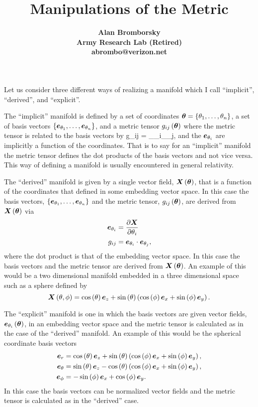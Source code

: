 \documentclass[12pt]{book}
\title{\bf\Large Manipulations of the Metric}
\author{\bf Alan Bromborsky\\
\bf Army Research Lab (Retired)\\
\bf abrombo@verizon.net}
\begin{document}
\parskip 10pt
\maketitle
Let us consider three different ways of realizing a manifold which I call ``implicit'', ``derived'', and 
``explicit''.

The ``implicit'' manifold is defined by a set of coordinates $\bm{\theta} = \left \{ {\theta_{1},\dots,\theta_{n}} \right \}$, 
a set of basis vectors $\left \{ {\bm{e}_{\theta_{1}},\dots,\bm{e}_{\theta_{n}}} \right \}$, 
and a metric tensor ${g_{ij}}\left ( {\bm{\theta}} \right )$ where the
metric tensor is related to the basis vectors by 
\be
	g_{ij} = \eb_{\theta_{i}}\cdot\eb_{\theta_{j}},
\ee
and the $\bm{e}_{\theta_{i}}$ are implicitly a function of the coordinates.  That is to say for an ``implicit'' manifold
the metric tensor defines the dot products of the basis vectors and not vice versa. This way of defining a 
manifold is usually encountered in general relativity.

The ``derived'' manifold is given by a single vector field, ${\bm{X}}\left ( {\bm{\theta}} \right )$, that is a function of 
the coordinates that defined in some embedding vector space. In this case the basis vectors, 
$\left \{ {\bm{e}_{\theta_{1}},\dots,\bm{e}_{\theta_{n}}} \right \}$ and the metric tensor, ${g_{ij}}\left ( {\bm{\theta}} \right )$, are derived
from ${\bm{X}}\left ( {\bm{\theta}} \right )$ via
\begin{align}
	\bm{e}_{\theta_{i}} &= \displaystyle\frac{\partial{\bm{X}}}{\partial{\theta_{i}}} \\
	g_{ij} &= \bm{e}_{\theta_{i}}\cdot\bm{e}_{\theta_{j}},
\end{align}
where the dot product is that of the embedding vector space. In this case the basis vectors and the metric tensor
are derived from ${\bm{X}}\left ( {\bm{\theta}} \right )$. An example of this would be a two dimensional manifold embedded in
a three dimensional space such as a sphere defined by
$${\bm{X}}\left ( {\theta,\phi} \right ) = 
{\cos}\left ( {\theta} \right )\bm{e}_{z}+{\sin}\left ( {\theta} \right )\left ( {{\cos}\left ( {\phi} \right )\bm{e}_{x}+{\sin}\left ( {\phi} \right )\bm{e}_{y}} \right ).$$

The ``explicit'' manifold is one in which the basis vectors are given vector fields, 
${\bm{e}_{\theta_{i}}}\left ( {\bm{\theta}} \right )$, in an embedding vector space and the metric tensor is calculated as in the
case of the ``derived'' manifold. An example of this would be the spherical coordinate basis vectors
\begin{align*}
	\bm{e}_{r} &= {\cos}\left ( {\theta} \right )\bm{e}_{z}+{\sin}\left ( {\theta} \right )\left ( {{\cos}\left ( {\phi} \right )\bm{e}_{x}+{\sin}\left ( {\phi} \right )\bm{e}_{y}} \right ), \\
	\bm{e}_{\theta} &= {\sin}\left ( {\theta} \right )\bm{e}_{z}-{\cos}\left ( {\theta} \right )\left ( {{\cos}\left ( {\phi} \right )\bm{e}_{x}+{\sin}\left ( {\phi} \right )\bm{e}_{y}} \right ), \\
	\bm{e}_{\phi} &= {-\sin}\left ( {\phi} \right )\bm{e}_{x}+{\cos}\left ( {\phi} \right )\bm{e}_{y}.
\end{align*}
In this case the basis vectors can be normalized vector fields and the metric tensor is calculated as in the
``derived'' case.
\end{document}
